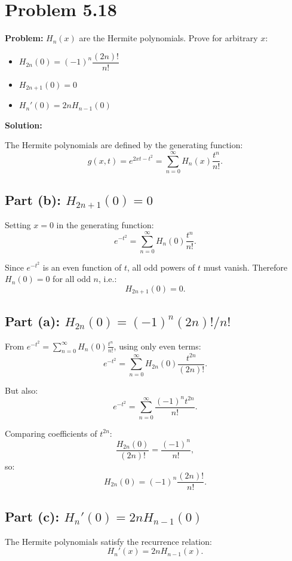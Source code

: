 \documentclass[12pt]{article}
\begin{document}
\section*{Problem 5.18}

\textbf{Problem:} $H_n(x)$ are the Hermite polynomials. Prove for arbitrary $x$:
\begin{itemize}
\item[(a)] $H_{2n}(0) = (-1)^n \dfrac{(2n)!}{n!}$
\item[(b)] $H_{2n+1}(0) = 0$
\item[(c)] $H_n'(0) = 2nH_{n-1}(0)$
\end{itemize}

\bigskip
\textbf{Solution:}

The Hermite polynomials are defined by the generating function:
\[
g(x,t) = e^{2xt - t^2} = \sum_{n=0}^{\infty} H_n(x)\frac{t^n}{n!}. \tag{$*$}
\]

\subsection*{Part (b): $H_{2n+1}(0) = 0$}

Setting $x = 0$ in the generating function:
\[
e^{-t^2} = \sum_{n=0}^{\infty} H_n(0)\frac{t^n}{n!}.
\]

Since $e^{-t^2}$ is an even function of $t$, all odd powers of $t$ must vanish. Therefore $H_n(0) = 0$ for all odd $n$, i.e.:
\[
\boxed{H_{2n+1}(0) = 0.}
\]

\subsection*{Part (a): $H_{2n}(0) = (-1)^n(2n)!/n!$}

From $e^{-t^2} = \sum_{n=0}^{\infty} H_n(0)\frac{t^n}{n!}$, using only even terms:
\[
e^{-t^2} = \sum_{n=0}^{\infty} H_{2n}(0)\frac{t^{2n}}{(2n)!}.
\]

But also:
\[
e^{-t^2} = \sum_{n=0}^{\infty}\frac{(-1)^n t^{2n}}{n!}.
\]

Comparing coefficients of $t^{2n}$:
\[
\frac{H_{2n}(0)}{(2n)!} = \frac{(-1)^n}{n!},
\]
so:
\[
\boxed{H_{2n}(0) = (-1)^n\frac{(2n)!}{n!}.}
\]

\subsection*{Part (c): $H_n'(0) = 2nH_{n-1}(0)$}

The Hermite polynomials satisfy the recurrence relation:
\[
H_n'(x) = 2nH_{n-1}(x).
\]
\end{document}
